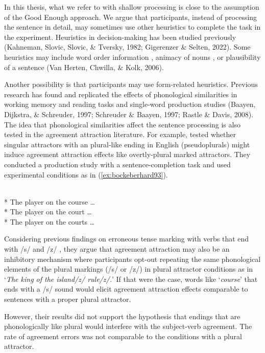 In this thesis, what we refer to with shallow processing is close to the assumption of the Good Enough approach. We argue that participants, instead of processing the sentence in detail, may sometimes use other heuristics to complete the task in the experiment. Heuristics in decision-making has been studied previously (Kahneman, Slovic, Slovic, \& Tversky, 1982; Gigerenzer \& Selten, 2022). Some heuristics may include word order information \citep{TownsendBever2001}, animacy of nouns \citep{Lamers2007}, or plausibility of a sentence (Van Herten, Chwilla, \& Kolk, 2006). 

Another possibility is that participants may use form-related heuristics. Previous research has found and replicated the effects of phonological similarities in working memory and reading tasks \citep{CopelandRadvansky2001} and single-word production studies (Baayen, Dijkstra, \& Schreuder, 1997; Schreuder \& Baayen, 1997; Rastle \& Davis, 2008). The idea that phonological similarities affect the sentence processing is also tested in the agreement attraction literature. For example,  tested whether singular attractors with an plural-like ending in English (pseudoplurals) might induce agreement attraction effects like overtly-plural marked attractors. They conducted a production study with a sentence-completion task and used experimental conditions as in (\ref{ex:bockeberhard93}).

\ea \label{ex:bockeberhard93}
     \\* The {player} on the {course} \ldots{}
     \\* The {player} on the {court} \ldots{}
     \\* The {player} on the {courts} \ldots{}
    \z
\z

Considering previous findings on erroneous tense marking with verbs that end with /s/ and /z/ \citep{SM86}, they argue that agreement attraction may also be an inhibitory mechanism where participants opt-out repeating the same phonological elements of the plural markings (/s/ or /z/) in plural attractor conditions as in `\emph{The king of the island/z/ rule/z/.}' If that were the case, words like `\emph{course}' that ends with a /s/ sound would elicit agreement attraction effects comparable to sentences with a proper plural attractor. 

However, their results did not support the hypothesis that endings that are phonologically like plural would interfere with the subject-verb agreement. The rate of agreement errors was not comparable to the conditions with a plural attractor.


